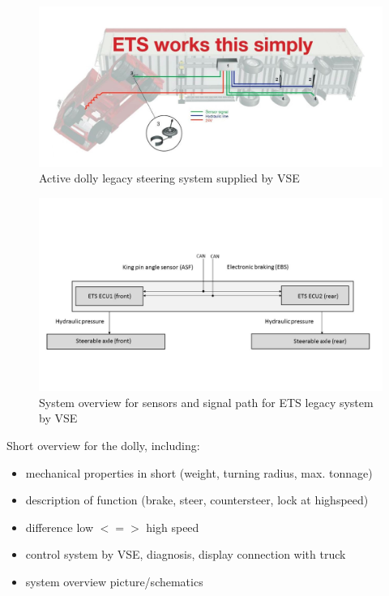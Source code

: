 \documentclass[ExampleMasters.tex]{subfiles}
\begin{document}
\begin{figure}[h]
\centering
\includegraphics[width=1.0\linewidth]{figures/legacy_system_vse}
\caption[]{Active dolly legacy steering system supplied by VSE\cite{dolly_datasheet}}
\label{fig:legacy_system_vse}
\end{figure}

\begin{figure}[ph]
\centering
\includegraphics[width=1\linewidth]{figures/system_overview_ETS}

\caption{System overview for sensors and signal path for ETS legacy system by VSE}
\label{fig:system_overview_ETS}
\end{figure}




Short overview for the dolly, including: 

\begin{itemize}
\item mechanical properties in short (weight, turning radius, max. tonnage)
\item description of function (brake, steer, countersteer, lock at highspeed)
\item difference low $<=>$ high speed
\item control system by VSE, diagnosis, display connection with truck
\item system overview picture/schematics

\end{itemize}
\end{document}
